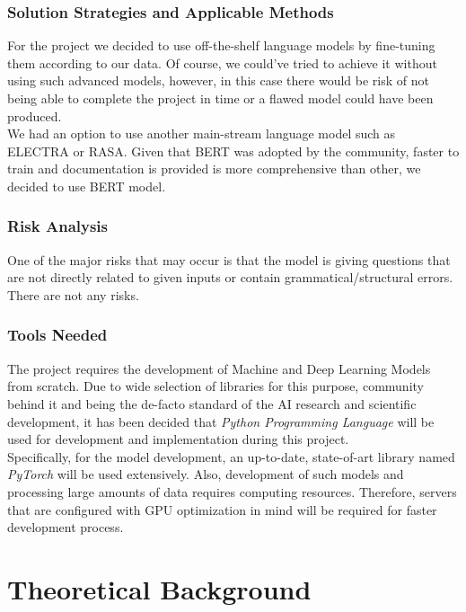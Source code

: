 \documentclass{mefsdp}
\begin{document}
	
	\subsubsection{Solution Strategies and Applicable Methods}
	For the project we decided to use off-the-shelf language models by fine-tuning them according to our data. Of course, we could’ve tried to achieve it without using such advanced models, however, in this case there would be risk of not being able to complete the project in time or a flawed model could have been produced.\\
	
	We had an option to use another main-stream language model such as ELECTRA or RASA. Given that BERT was adopted by the community, faster to train and documentation is provided is more comprehensive than other, we decided to use BERT model.
	
	
	\subsubsection{Risk Analysis}
	One of the major risks that may occur is that the model is giving questions that are not directly related to given inputs or contain grammatical/structural errors. There are not any risks.
	
	\subsubsection{Tools Needed}
	The project requires the development of Machine and Deep Learning Models from scratch. Due to wide selection of libraries for this purpose, community behind it and being the de-facto standard of the AI research and scientific development, it has been decided that \textit{Python Programming Language} will be used for development and implementation during this project.\\
	
	Specifically, for the model development, an up-to-date, state-of-art library named \textit{PyTorch} will be used extensively. Also, development of such models and processing large amounts of data requires computing resources. Therefore, servers that are configured with GPU optimization in mind will be required for faster development process.
	
	
	
	\section{Theoretical Background}
\end{document}
